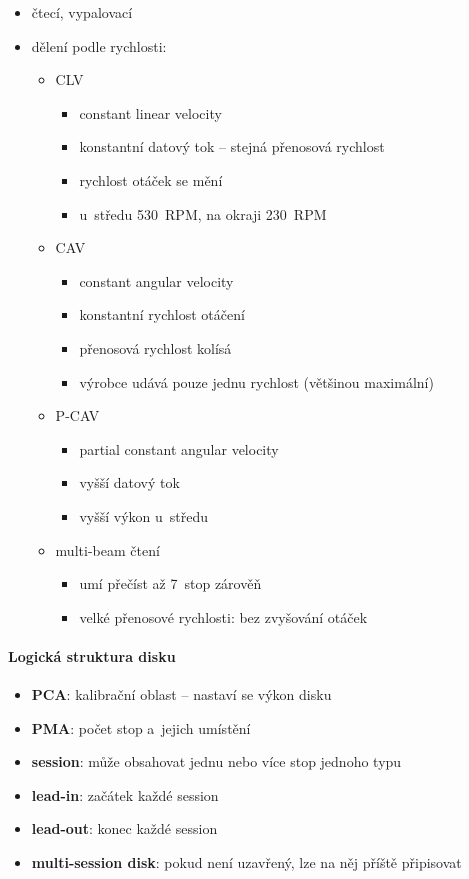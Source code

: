 \documentclass[a4paper,12pt]{article}
\providecommand{\tightlist}{%
\setlength{\itemsep}{0pt}\setlength{\parskip}{0pt}}
\begin{document}
\begin{itemize}
  \tightlist
  \item čtecí, vypalovací
  \item dělení podle rychlosti:
  \begin{itemize}
    \tightlist
    \item CLV
    \begin{itemize}
      \tightlist
      \item constant linear velocity
      \item konstantní datový tok -- stejná přenosová rychlost
      \item rychlost otáček se mění
      \item u~středu 530~RPM, na okraji 230~RPM
    \end{itemize}
    \item CAV
    \begin{itemize}
      \tightlist
      \item constant angular velocity
      \item konstantní rychlost otáčení
      \item přenosová rychlost kolísá
      \item výrobce udává pouze jednu rychlost (většinou maximální)
    \end{itemize}
    \item P-CAV
    \begin{itemize}
      \tightlist
      \item partial constant angular velocity
      \item vyšší datový tok
      \item vyšší výkon u~středu
    \end{itemize}
    \item multi-beam čtení
    \begin{itemize}
      \tightlist
      \item umí přečíst až 7~stop zárověň
      \item velké přenosové rychlosti: bez zvyšování otáček
    \end{itemize}
  \end{itemize}
\end{itemize}

\paragraph{Logická struktura disku}

\begin{itemize}
  \tightlist
  \item \textbf{PCA}: kalibrační oblast -- nastaví se výkon disku
  \item \textbf{PMA}: počet stop a~jejich umístění
  \item \textbf{session}: může obsahovat jednu nebo více stop jednoho typu
  \item \textbf{lead-in}: začátek každé session
  \item \textbf{lead-out}: konec každé session
  \item \textbf{multi-session disk}: pokud není uzavřený, lze na něj příště
  připisovat
\end{itemize}
\end{document}
